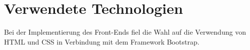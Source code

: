 \section{Verwendete Technologien}

Bei der Implementierung des Front-Ends fiel die Wahl auf die Verwendung von \acs{HTML} und \acs{CSS} in Verbindung mit dem Framework Bootstrap.